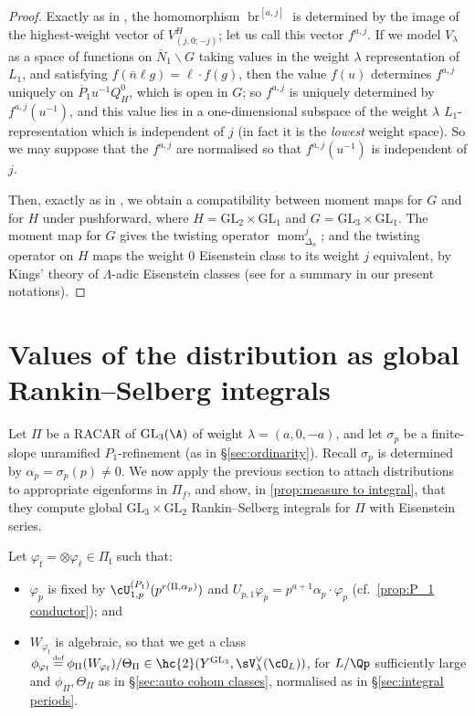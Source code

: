 \documentclass[10pt,reqno,a4paper]{amsart}
\newcommand{\subf}{_{\mathrm{f}}}
\newcommand{\GL}{\mathrm{GL}}
\begin{document}
\begin{proof}
Exactly as in \cite{spherical_II}, the homomorphism $\operatorname{br}^{[a, j]}$ is determined by the image of the highest-weight vector of $V_{(j, 0; -j)}^H$; let us call this vector $f^{a, j}$. If we model $V_\lambda$ as a space of functions on $\bar{N}_1 \backslash G$ taking values in the weight $\lambda$ representation of $L_1$, and satisfying $f(\bar{n} \ell g) = \ell \cdot f(g)$, then the value $f(u)$ determines $f^{a, j}$ uniquely on $\overline{P}_1 u^{-1} Q_H^0$, which is open in $G$; so $f^{a, j}$ is uniquely determined by $f^{a, j}(u^{-1})$, and this value lies in a one-dimensional subspace of the weight $\lambda$ $L_1$-representation which is independent of $j$ (in fact it is the \emph{lowest} weight space). So we may suppose that the $f^{a, j}$ are normalised so that $f^{a, j}(u^{-1})$ is independent of $j$.

Then, exactly as in \cite{spherical_II}, we obtain a compatibility between moment maps for $G$ and for $H$ under pushforward, where $H = \GL_2 \times \GL_1$ and $G = \GL_3 \times \GL_1$. The moment map for $G$ gives the twisting operator $\operatorname{mom}^j_{\Delta_n}$; and the twisting operator on $H$ maps the weight 0 Eisenstein class to its weight $j$ equivalent, by Kings' theory of $\Lambda$-adic Eisenstein classes (see \cite{KLZ17} for a summary in our present notations).
\end{proof}






\section{Values of the distribution as global Rankin--Selberg integrals}\label{sec:measure to integral}

Let $\Pi$ be a RACAR of $\GL_3(\A)$ of weight $\lambda = (a,0,-a)$, and let $\sigma_p$ be a finite-slope unramified $P_1$-refinement (as in \S\ref{sec:ordinarity}). Recall $\sigma_p$ is determined by $\alpha_p = \sigma_p(p) \neq 0$. We now apply the previous section to attach distributions to appropriate eigenforms in $\Pi_f$, and show, in \cref{prop:measure to integral}, that they compute global $\GL_3 \times \GL_2$ Rankin--Selberg integrals for $\Pi$ with Eisenstein series.

 Let $\varphi\subf = \otimes \varphi_\ell \in \Pi\subf$ such that:
\begin{itemize}\setlength{\itemsep}{0pt}
\item[(a)] $\varphi_p$ is fixed by $\cU_{1,p}^{(P_1)}(p^{r(\Pi,\alpha_p)})$ and $U_{p,1}\varphi_p = p^{a+1}\alpha_p \cdot \varphi_p$ (cf.\ \cref{prop:P_1 conductor}); and
\item[(b)] $W_{\varphi\subf}$ is algebraic, so that we get a class $\phi_{\varphi\subf} \defeq \phi_\Pi(W_{\varphi\subf})/\Theta_\Pi \in \hc{2}(Y^{\GL_3},\sV_\lambda^\vee(\cO_L))$, for $L/\Qp$ sufficiently large and $\phi_\Pi, \Theta_\Pi$ as in \S\ref{sec:auto cohom classes}, normalised as in \S\ref{sec:integral periods}.
\end{itemize}
\end{document}

